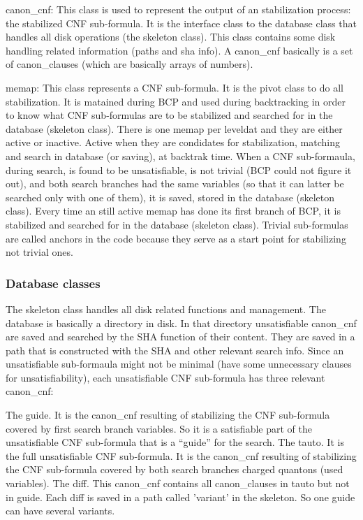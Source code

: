 \documentclass{easychair}
\begin{document}
canon\_cnf: This class is used to represent the output of an stabilization process: the stabilized CNF sub-formula. It is the interface class to the database class that handles all disk operations (the skeleton class). This class contains some disk handling related information (paths and sha info). A canon\_cnf basically is a set of canon\_clauses (which are basically arrays of numbers).

memap: This class represents a CNF sub-formula. It is the pivot class to do all stabilization. It is matained during BCP and used during backtracking in order to know what CNF sub-formulas are to be stabilized and searched for in the database (skeleton class). There is one memap per leveldat and they are either active or inactive. Active when they are condidates for stabilization, matching and search in database (or saving), at backtrak time. When a CNF  sub-formaula, during search, is found to be unsatisfiable, is not trivial (BCP could not figure it out), and both search branches had the same variables (so that it can latter be searched only with one of them), it is saved, stored in the database (skeleton class). Every time an still active memap has done its first branch of BCP, it is stabilized and searched for in the database (skeleton class). Trivial sub-formulas are called anchors in the code because they serve as a start point for stabilizing not trivial ones. 

\subsubsection{Database classes}

The skeleton class handles all disk related functions and management. The database is basically a directory in disk. In that directory unsatisfiable canon\_cnf are saved and searched by the SHA function of their content. They are saved in a path that is constructed with the SHA and other relevant search info. 
Since an unsatisfiable sub-formaula might not be minimal (have some unnecessary clauses for unsatisfiability), each unsatisfiable CNF sub-formula has three relevant canon\_cnf: 

The guide. It is the canon\_cnf resulting of stabilizing the CNF sub-formula covered by first search branch variables. So it is a satisfiable part of the unsatisfiable CNF sub-formula that is a “guide” for the search.
The tauto. It is the full unsatisfiable CNF sub-formula. It is the canon\_cnf resulting of stabilizing the CNF sub-formula covered by both search branches charged quantons (used variables). 
The diff. This canon\_cnf contains all canon\_clauses in tauto but not in guide. Each diff is saved in a path called 'variant' in the skeleton. So one guide can have several variants. 
\end{document}
